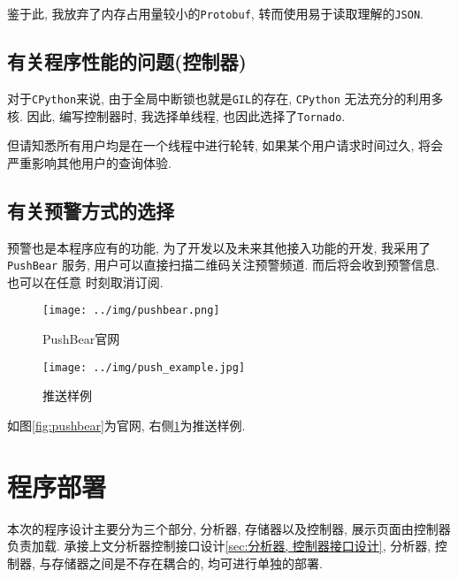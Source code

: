 鉴于此, 我放弃了内存占用量较小的\texttt{Protobuf},
转而使用易于读取理解的\texttt{JSON}.


\section{有关程序性能的问题(控制器)}

  对于\texttt{CPython}来说, 由于全局中断锁也就是\texttt{GIL}的存在, \texttt{CPython}
无法充分的利用多核. 因此, 编写控制器时, 我选择单线程, 也因此选择了\texttt{Tornado}.

但请知悉所有用户均是在一个线程中进行轮转, 如果某个用户请求时间过久,
将会严重影响其他用户的查询体验.

\section{有关预警方式的选择}

  预警也是本程序应有的功能, 为了开发以及未来其他接入功能的开发, 我采用了\texttt{PushBear}
服务, 用户可以直接扫描二维码关注预警频道. 而后将会收到预警信息. 也可以在任意
时刻取消订阅.

\begin{figure}[htbp]


\centering
\begin{minipage}{0.76\textwidth}

    \texttt{[image: ../img/pushbear.png]}
    \caption{PushBear官网}
    \label{fig:pushbear}

\end{minipage} \hfill
\begin{minipage}{0.22\textwidth}

\centering
    \texttt{[image: ../img/push\_example.jpg]}
    \caption{推送样例}
    \label{fig:push_example}
\end{minipage}

\end{figure}

如图\ref{fig:pushbear}为官网, 右侧\ref{fig:push_example}为推送样例.


\chapter{程序部署}

  本次的程序设计主要分为三个部分, 分析器, 存储器以及控制器, 展示页面由控制器
负责加载. 承接上文分析器控制接口设计\ref{sec:分析器, 控制器接口设计}, 分析器, 
控制器, 与存储器之间是不存在耦合的, 均可进行单独的部署.

